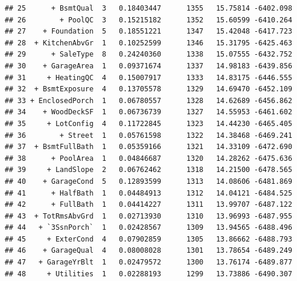 \documentclass[american,]{article}
\theoremstyle{definition}
\theoremstyle{definition}
\theoremstyle{definition}
\theoremstyle{remark}
\begin{document}
\begin{verbatim}
## 25      + BsmtQual  3   0.18403447      1355   15.75814 -6402.098
## 26        + PoolQC  3   0.15215182      1352   15.60599 -6410.264
## 27    + Foundation  5   0.18551221      1347   15.42048 -6417.723
## 28  + KitchenAbvGr  1   0.10252599      1346   15.31795 -6425.463
## 29      + SaleType  8   0.24240360      1338   15.07555 -6432.752
## 30    + GarageArea  1   0.09371674      1337   14.98183 -6439.856
## 31     + HeatingQC  4   0.15007917      1333   14.83175 -6446.555
## 32  + BsmtExposure  4   0.13705578      1329   14.69470 -6452.109
## 33 + EnclosedPorch  1   0.06780557      1328   14.62689 -6456.862
## 34    + WoodDeckSF  1   0.06736739      1327   14.55953 -6461.602
## 35     + LotConfig  4   0.11722845      1323   14.44230 -6465.405
## 36        + Street  1   0.05761598      1322   14.38468 -6469.241
## 37  + BsmtFullBath  1   0.05359166      1321   14.33109 -6472.690
## 38      + PoolArea  1   0.04846687      1320   14.28262 -6475.636
## 39     + LandSlope  2   0.06762462      1318   14.21500 -6478.565
## 40    + GarageCond  5   0.12893599      1313   14.08606 -6481.869
## 41      + HalfBath  1   0.04484913      1312   14.04121 -6484.525
## 42      + FullBath  1   0.04414227      1311   13.99707 -6487.122
## 43  + TotRmsAbvGrd  1   0.02713930      1310   13.96993 -6487.955
## 44   + `3SsnPorch`  1   0.02428567      1309   13.94565 -6488.496
## 45     + ExterCond  4   0.07902859      1305   13.86662 -6488.793
## 46    + GarageQual  4   0.08008028      1301   13.78654 -6489.249
## 47   + GarageYrBlt  1   0.02479572      1300   13.76174 -6489.877
## 48     + Utilities  1   0.02288193      1299   13.73886 -6490.307
\end{verbatim}
\end{document}
